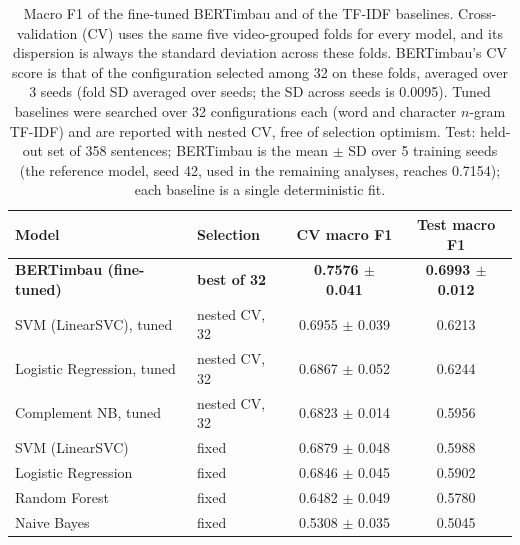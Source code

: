 \begin{table}[!t]
\centering
\caption{Macro F1 of the fine-tuned BERTimbau and of the TF-IDF baselines. Cross-validation (CV) uses the same five video-grouped folds for every model, and its dispersion is always the standard deviation across these folds. BERTimbau's CV score is that of the configuration selected among 32 on these folds, averaged over 3 seeds (fold SD averaged over seeds; the SD across seeds is 0.0095). Tuned baselines were searched over 32 configurations each (word and character $n$-gram TF-IDF) and are reported with nested CV, free of selection optimism. Test: held-out set of 358 sentences; BERTimbau is the mean $\pm$ SD over 5 training seeds (the reference model, seed 42, used in the remaining analyses, reaches 0.7154); each baseline is a single deterministic fit.}
\label{tab:baselines}
\begin{tabular}{llcc}
\toprule
Model & Selection & CV macro F1 & Test macro F1 \\
\midrule
\textbf{BERTimbau (fine-tuned)} & \textbf{best of 32} & \textbf{0.7576 $\pm$ 0.041} & \textbf{0.6993 $\pm$ 0.012} \\
\midrule
SVM (LinearSVC), tuned & nested CV, 32 & 0.6955 $\pm$ 0.039 & 0.6213 \\
Logistic Regression, tuned & nested CV, 32 & 0.6867 $\pm$ 0.052 & 0.6244 \\
Complement NB, tuned & nested CV, 32 & 0.6823 $\pm$ 0.014 & 0.5956 \\
\midrule
SVM (LinearSVC) & fixed & 0.6879 $\pm$ 0.048 & 0.5988 \\
Logistic Regression & fixed & 0.6846 $\pm$ 0.045 & 0.5902 \\
Random Forest & fixed & 0.6482 $\pm$ 0.049 & 0.5780 \\
Naive Bayes & fixed & 0.5308 $\pm$ 0.035 & 0.5045 \\
\bottomrule
\end{tabular}
\end{table}
